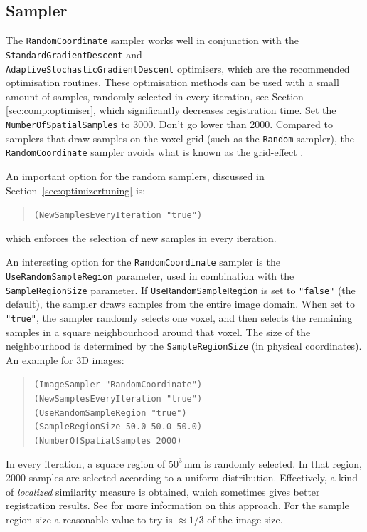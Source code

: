 \documentclass[]{report}
\begin{document}
\subsection{Sampler}\label{sec:samplertuning}

The \texttt{RandomCoordinate} sampler works well in conjunction with
the \texttt{StandardGradientDescent} and\\
\texttt{AdaptiveStochasticGradientDescent} optimisers, which are the
recommended optimisation routines. These optimisation methods can be
used with a small amount of samples, randomly selected in every
iteration, see Section \ref{sec:comp:optimiser}, which significantly
decreases registration time. Set the \texttt{NumberOfSpatialSamples}
to 3000. Don't go lower than 2000. Compared to samplers that draw
samples on the voxel-grid (such as the \texttt{Random} sampler), the
\texttt{RandomCoordinate} sampler avoids what is known as the
grid-effect \citep{The08:Halton}.

An important option for the random samplers, discussed in
Section~\ref{sec:optimizertuning} is:
\begin{quote}
  \texttt{(NewSamplesEveryIteration "true")}
\end{quote}
which enforces the selection of new samples in every iteration.

An interesting option for the \texttt{RandomCoordinate} sampler is
the \texttt{UseRandomSampleRegion} parameter, used in combination
with the \texttt{SampleRegionSize} parameter. If
\texttt{UseRandomSampleRegion} is set to \texttt{"false"} (the
default), the sampler draws samples from the entire image domain.
When set to \texttt{"true"}, the sampler randomly selects one
voxel, and then selects the remaining samples in a square
neighbourhood around that voxel. The size of the neighbourhood is
determined by the \texttt{SampleRegionSize} (in physical
coordinates). An example for 3D images:
\begin{quote}
  \texttt{(ImageSampler "RandomCoordinate")}\\
  \texttt{(NewSamplesEveryIteration "true")}\\
  \texttt{(UseRandomSampleRegion "true")}\\
  \texttt{(SampleRegionSize 50.0 50.0 50.0)}\\
  \texttt{(NumberOfSpatialSamples 2000)}\\
\end{quote}
In every iteration, a square region of $50^3$\,mm is randomly
selected. In that region, 2000 samples are selected according to a
uniform distribution. Effectively, a kind of \emph{localized}
similarity measure is obtained, which sometimes gives better
registration results. See \cite{Kle08:Automatic} for more
information on this approach. For the sample region size a
reasonable value to try is $\approx1/3$ of the image size.
\end{document}
